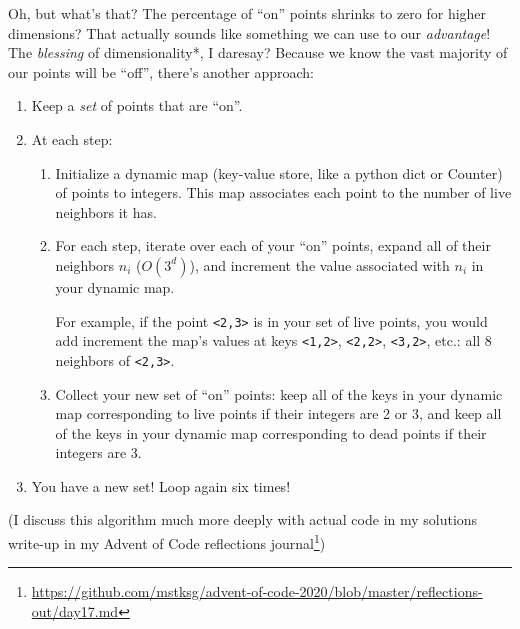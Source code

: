 \documentclass[]{article}
\renewcommand{\href}[2]{#2\footnote{\url{#1}}}
\begin{document}
Oh, but what's that? The percentage of ``on'' points shrinks to zero for higher
dimensions? That actually sounds like something we can use to our
\emph{advantage}! The \emph{blessing} of dimensionality*, I daresay? Because we
know the vast majority of our points will be ``off'', there's another approach:

\begin{enumerate}
\def\labelenumi{\arabic{enumi}.}
\tightlist
\item
  Keep a \emph{set} of points that are ``on''.
\item
  At each step:

  \begin{enumerate}
  \def\labelenumii{\alph{enumii}.}
  \item
    Initialize a dynamic map (key-value store, like a python dict or Counter) of
    points to integers. This map associates each point to the number of live
    neighbors it has.
  \item
    For each step, iterate over each of your ``on'' points, expand all of their
    neighbors \(n_i\) (\(O(3^d)\)), and increment the value associated with
    \(n_i\) in your dynamic map.

    For example, if the point \texttt{\textless{}2,3\textgreater{}} is in your
    set of live points, you would add increment the map's values at keys
    \texttt{\textless{}1,2\textgreater{}},
    \texttt{\textless{}2,2\textgreater{}},
    \texttt{\textless{}3,2\textgreater{}}, etc.: all 8 neighbors of
    \texttt{\textless{}2,3\textgreater{}}.
  \item
    Collect your new set of ``on'' points: keep all of the keys in your dynamic
    map corresponding to live points if their integers are 2 or 3, and keep all
    of the keys in your dynamic map corresponding to dead points if their
    integers are 3.
  \end{enumerate}
\item
  You have a new set! Loop again six times!
\end{enumerate}

(I discuss this algorithm much more deeply with actual code in
\href{https://github.com/mstksg/advent-of-code-2020/blob/master/reflections-out/day17.md}{my
solutions write-up in my Advent of Code reflections journal})
\end{document}
